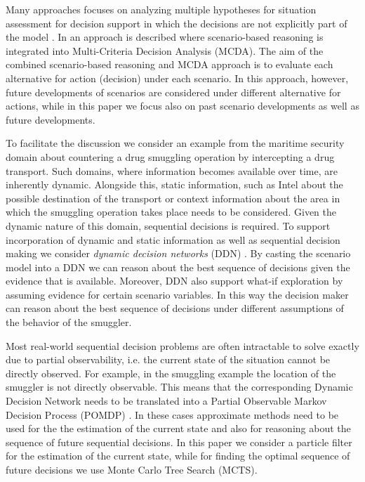 \documentclass[conference]{IEEEtran}
\begin{document}
Many approaches focuses on analyzing multiple hypotheses for situation assessment for decision support in which the decisions are not explicitly part of the model \cite{roy07fus,gustavi11eisic,holsopple}. In \cite{comes09iscram} an approach is described where scenario-based reasoning is integrated into Multi-Criteria Decision Analysis (MCDA). The aim of the combined scenario-based reasoning and MCDA approach is to evaluate each alternative for action (decision) under each scenario. In this approach, however, future developments of scenarios are considered under different alternative for actions, while in this paper we focus also on past scenario developments as well as future developments.



To facilitate the discussion we consider an example from the maritime security domain about countering a drug smuggling operation by intercepting a drug transport. Such domains, where information becomes available over time, are inherently dynamic. Alongside this, static information, such as Intel about the possible destination of the transport or context information about the area in which the smuggling operation takes place needs to be considered. Given the dynamic nature of this domain, sequential decisions is required. To support incorporation of dynamic and static information as well as sequential decision making we consider {\em dynamic decision networks} (DDN) \cite{russell02bn, jensen07book}. By casting the scenario model into a DDN we can reason about the best sequence of decisions given the evidence that is available. Moreover, DDN also support what-if exploration by assuming evidence for certain scenario variables. In this way the decision maker can reason about the best sequence of decisions under different assumptions of the behavior of the smuggler.


Most real-world sequential decision problems are often intractable to solve exactly due to partial observability, i.e. the current state of the situation cannot be directly observed. For example, in the smuggling example the location of the smuggler is not directly observable. This means that the corresponding Dynamic Decision Network needs to be translated into a Partial Observable Markov Decision Process (POMDP) \cite{russell02bn}. In these cases approximate methods need to be used for the the estimation of the current state and also for reasoning about the sequence of future sequential decisions. In this paper we consider a particle filter for the estimation of the current state, while for finding the optimal sequence of future decisions we use Monte Carlo Tree Search (MCTS).
\end{document}
